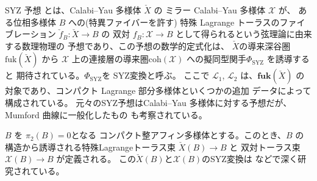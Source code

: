 \documentclass[uplatex,dvipdfmx,12pt]{jsarticle}
\numberwithin{equation}{section}
\theoremstyle{definition}
\newcommand{\opn}[1]{\operatorname{#1}}
\newcommand{\catn}[1]{\mathbf{#1}}
\begin{document}
SYZ 予想\cite{stromingerMirrorSymmetryTduality1996}
とは、Calabi--Yau 多様体 $\check{X}$ の
ミラー Calabi--Yau 多様体 $\mathcal{X}$ が、
ある位相多様体 $B$ への(特異ファイバーを許す)
特殊 Lagrange トーラスのファイブレーション
$\check{f}_{B}\colon \check{X}\to B$ の
双対 $f_{B}\colon 
\mathcal{X}\to B$
として得られるという弦理論に由来する数理物理の
予想であり、この予想の数学的定式化は、
$\check{X}$の導来深谷圏 $\mathrm{fuk}(\check{X})$ から
 $\mathcal{X}$ 上の連接層の導来圏$\mathrm{coh}(\mathcal{X})$
への擬同型関手$\Phi_{\mathrm{SYZ}}$ を誘導すると
期待されている。$\Phi_{\mathrm{SYZ}}$を
SYZ変換と呼ぶ。
ここで
$\mathscr{L}_1$, $\mathscr{L}_2$ は、$\catn{fuk}(\check{X})$
の対象であり、コンパクト Lagrange 部分多様体といくつかの追加
データによって構成されている。
元々のSYZ予想はCalabi--Yau 多様体に対する予想だが、
Mumford 曲線に一般化したもの\cite{auroux2022lagrangian}
も考察されている。

$B$ を
$\pi_2(B)=0$となる
コンパクト整アフィン多様体とする。このとき、$B$ の
構造から誘導される特殊Lagrangeトーラス束 
$\check{X}(B)\to B$ と 
双対トーラス束 $\mathcal{X}(B)\to B$ が定義される。
この$\check{X}(B)$と$\mathcal{X}(B)$のSYZ変換は
\cite{MR1882331,MR4301560}などで深く研究されている。
\end{document}
